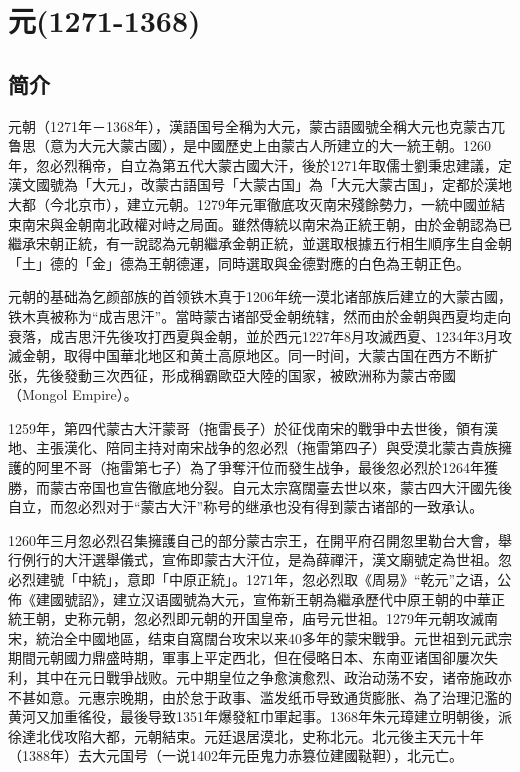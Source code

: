
\chapter{元\tiny(1271-1368)}

\section{简介}

元朝（1271年－1368年），漢語国号全稱为大元，蒙古語國號全稱大元也克蒙古兀鲁思（意为大元大蒙古國），是中國歷史上由蒙古人所建立的大一統王朝。1260年，忽必烈稱帝，自立為第五代大蒙古國大汗，後於1271年取儒士劉秉忠建議，定漢文國號為「大元」，改蒙古語国号「大蒙古国」為「大元大蒙古国」，定都於漢地大都（今北京市），建立元朝。1279年元軍徹底攻灭南宋殘餘勢力，一統中國並結束南宋與金朝南北政權对峙之局面。雖然傳統以南宋為正統王朝，由於金朝認為已繼承宋朝正統，有一說認為元朝繼承金朝正統，並選取根據五行相生順序生自金朝「土」德的「金」德為王朝德運，同時選取與金德對應的白色為王朝正色。

元朝的基础為乞颜部族的首领铁木真于1206年统一漠北诸部族后建立的大蒙古國，铁木真被称为“成吉思汗”。當時蒙古诸部受金朝统辖，然而由於金朝與西夏均走向衰落，成吉思汗先後攻打西夏與金朝，並於西元1227年8月攻滅西夏、1234年3月攻滅金朝，取得中国華北地区和黄土高原地区。同一时间，大蒙古国在西方不断扩张，先後發動三次西征，形成稱霸歐亞大陸的国家，被欧洲称为蒙古帝國（Mongol Empire）。

1259年，第四代蒙古大汗蒙哥（拖雷長子）於征伐南宋的戰爭中去世後，領有漢地、主張漢化、陪同主持对南宋战争的忽必烈（拖雷第四子）與受漠北蒙古貴族擁護的阿里不哥（拖雷第七子）為了爭奪汗位而發生战争，最後忽必烈於1264年獲勝，而蒙古帝国也宣告徹底地分裂。自元太宗窩闊臺去世以來，蒙古四大汗國先後自立，而忽必烈对于“蒙古大汗”称号的继承也没有得到蒙古诸部的一致承认。

1260年三月忽必烈召集擁護自己的部分蒙古宗王，在開平府召開忽里勒台大會，舉行例行的大汗選舉儀式，宣佈即蒙古大汗位，是為薛禪汗，漢文廟號定為世祖。忽必烈建號「中統」，意即「中原正統」。1271年，忽必烈取《周易》“乾元”之语，公佈《建國號詔》，建立汉语國號為大元，宣佈新王朝為繼承歷代中原王朝的中華正統王朝，史称元朝，忽必烈即元朝的开国皇帝，庙号元世祖。1279年元朝攻滅南宋，統治全中國地區，结束自窩闊台攻宋以来40多年的蒙宋戰爭。元世祖到元武宗期間元朝國力鼎盛時期，軍事上平定西北，但在侵略日本、东南亚诸国卻屢次失利，其中在元日戰爭战败。元中期皇位之争愈演愈烈、政治动荡不安，诸帝施政亦不甚如意。元惠宗晚期，由於怠于政事、滥发纸币导致通货膨胀、為了治理氾濫的黄河又加重徭役，最後导致1351年爆發紅巾軍起事。1368年朱元璋建立明朝後，派徐達北伐攻陷大都，元朝結束。元廷退居漠北，史称北元。北元後主天元十年（1388年）去大元国号（一说1402年元臣鬼力赤篡位建國鞑靼），北元亡。

